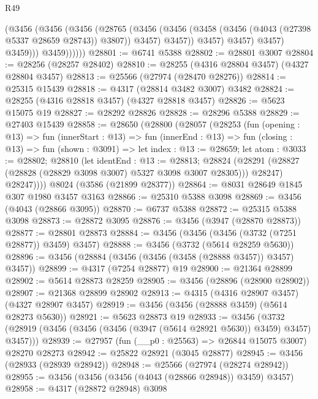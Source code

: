 \begin{lexlean}{R49}
\begin{coremodule}
                      (@3456
                        (@3456
                          (@3456
                            (@28765
                              (@3456
                                (@3456
                                  (@3458 (@3456 (@4043 (@27398 @5337 @28659 @28743)) @3807))
                                  @3457)
                                @3457))
                            @3457)
                          @3457)
                        @3457)
                      @3459)))
                @3459))))))
@28801 := @6741 @5388
@28802 := @28801 @3007
@28804 := @28256 (@28257 @28402)
@28810 := @28255 (@4316 @28804 @3457) (@4327 @28804 @3457)
@28813 := @25566 (@27974 (@28470 @28276))
@28814 := @25315 @15439
@28818 := @4317 (@28814 @3482 @3007) @3482
@28824 := @28255 (@4316 @28818 @3457) (@4327 @28818 @3457)
@28826 := @5623 @15075 @19
@28827 := @28292 @28826
@28828 := @28296 @5388
@28829 := @27403 @15439
@28858 := @28650
    (@28800
      (@28057
        (@28253
          (fun (opening : @13) =>
          fun (innerStart : @13) =>
          fun (innerEnd : @13) =>
          fun (closing : @13) =>
          fun (shown : @3091) =>
          let index : @13 := @28659;
          let atom : @3033 := @28802;
          @28810
            (let identEnd : @13 := @28813;
            @28824 (@28291 (@28827 (@28828 (@28829 @3098 @3007) @5327 @3098 @3007 @28305))) @28247)
            @28247))))
    @8024
    (@3586 (@21899 @28377))
@28864 := @8031 @28649 @1845 @307 @1980 @3457 @3163
@28866 := @25310 @5388 @3098
@28869 := @3456 (@4043 (@28866 @3095))
@28870 := @6737 @5388
@28872 := @25315 @5388 @3098
@28873 := @28872 @3095
@28876 := @3456 (@3947 (@28870 @28873))
@28877 := @28801 @28873
@28884 := @3456 (@3456 (@3456 (@3732 (@7251 @28877)) @3459) @3457)
@28888 := @3456 (@3732 (@5614 @28259 @5630))
@28896 := @3456 (@28884 (@3456 (@3456 (@3458 (@28888 @3457)) @3457) @3457))
@28899 := @4317 (@7254 @28877) @19
@28900 := @21364 @28899
@28902 := @5614 @28873 @28259
@28905 := @3456 (@28896 (@28900 @28902))
@28907 := @21368 @28899 @28902
@28913 := @4315 (@4316 @28907 @3457) (@4327 @28907 @3457)
@28919 := @3456 (@3456 (@28888 @3459) (@5614 @28273 @5630))
@28921 := @5623 @28873 @19
@28933 := @3456
    (@3732 (@28919 (@3456 (@3456 (@3456 (@3947 (@5614 @28921 @5630)) @3459) @3457) @3457)))
@28939 := @27957 (fun (__p0 : @25563) => @26844 @15075 @3007) @28270 @28273
@28942 := @25822 @28921 (@3045 @28877)
@28945 := @3456 (@28933 (@28939 @28942))
@28948 := @25566 (@27974 (@28274 @28942))
@28955 := @3456 (@3456 (@3456 (@4043 (@28866 @28948)) @3459) @3457)
@28958 := @4317 (@28872 @28948) @3098

\end{coremodule}
\end{lexlean}
